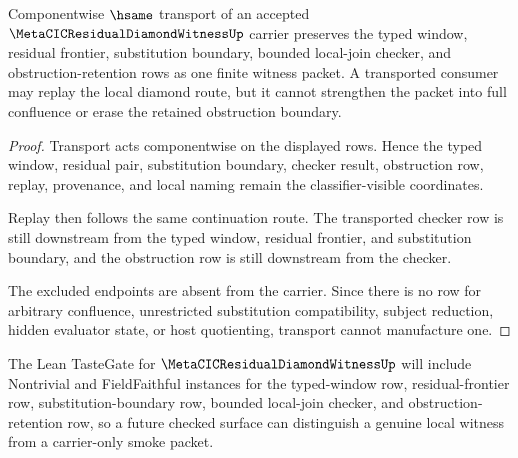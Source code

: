 \begin{theorem}
\label{thm:metacic-residual-diamond-witness-transport-stability}
Componentwise $\hsame$ transport of an accepted $\MetaCICResidualDiamondWitnessUp$ carrier preserves the typed window, residual frontier, substitution boundary, bounded local-join checker, and obstruction-retention rows as one finite witness packet. A transported consumer may replay the local diamond route, but it cannot strengthen the packet into full confluence or erase the retained obstruction boundary.
\end{theorem}
\begin{proof}
Transport acts componentwise on the displayed rows. Hence the typed window, residual pair, substitution boundary, checker result, obstruction row, replay, provenance, and local naming remain the classifier-visible coordinates.

Replay then follows the same continuation route. The transported checker row is still downstream from the typed window, residual frontier, and substitution boundary, and the obstruction row is still downstream from the checker.

The excluded endpoints are absent from the carrier. Since there is no row for arbitrary confluence, unrestricted substitution compatibility, subject reduction, hidden evaluator state, or host quotienting, transport cannot manufacture one.
\end{proof}



The Lean TasteGate for $\MetaCICResidualDiamondWitnessUp$ will include Nontrivial and FieldFaithful instances for the typed-window row, residual-frontier row, substitution-boundary row, bounded local-join checker, and obstruction-retention row, so a future checked surface can distinguish a genuine local witness from a carrier-only smoke packet.

